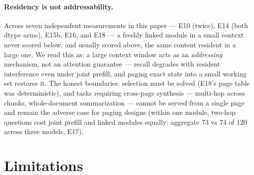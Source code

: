 \documentclass[11pt]{article}
\begin{document}
\paragraph{Residency is not addressability.}
Across seven independent measurements in this paper --- E10 (twice), E14 (both dtype arms), E15b, E16, and E18 --- a freshly linked module in a small context never scored below, and usually scored above, the same content resident in a large one. We read this as: a large context window acts as an \emph{addressing} mechanism, not an attention guarantee --- recall degrades with resident interference even under joint prefill, and paging exact state into a small working set restores it. The honest boundaries: selection must be solved (E18's page table was deterministic), and tasks requiring cross-page synthesis --- multi-hop across chunks, whole-document summarization --- cannot be served from a single page and remain the adverse case for paging designs (within one module, two-hop questions cost joint prefill and linked modules equally: aggregate 73 vs 74 of 120 across three models, E17).

\section{Limitations}
\label{sec:limitations}
\end{document}
